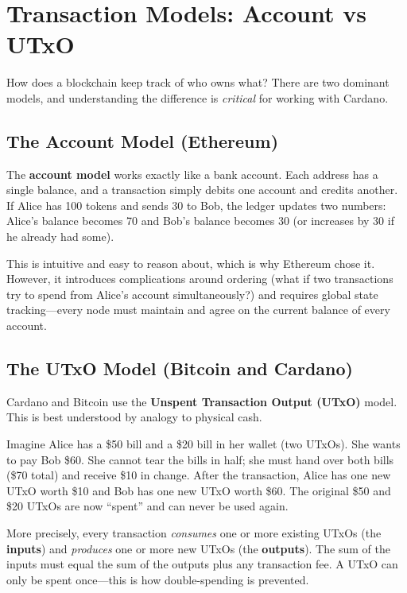 \section{Transaction Models: Account vs UTxO}
\label{sec:utxo-vs-account}

How does a blockchain keep track of who owns what?  There are two dominant
models, and understanding the difference is \emph{critical} for working with
Cardano.

\subsection{The Account Model (Ethereum)}

The \textbf{account model} works exactly like a bank account.  Each address
has a single balance, and a transaction simply debits one account and credits
another.  If Alice has 100 tokens and sends 30 to Bob, the ledger updates
two numbers: Alice's balance becomes 70 and Bob's balance becomes 30 (or
increases by 30 if he already had some).

This is intuitive and easy to reason about, which is why Ethereum chose it.
However, it introduces complications around ordering (what if two
transactions try to spend from Alice's account simultaneously?) and requires
global state tracking---every node must maintain and agree on the current
balance of every account.

\subsection{The UTxO Model (Bitcoin and Cardano)}

Cardano and Bitcoin use the \textbf{Unspent Transaction Output (UTxO)}
model.  This is best understood by analogy to physical cash.

Imagine Alice has a \$50 bill and a \$20 bill in her wallet (two UTxOs).  She
wants to pay Bob \$60.  She cannot tear the bills in half; she must hand over
both bills (\$70 total) and receive \$10 in change.  After the transaction,
Alice has one new UTxO worth \$10 and Bob has one new UTxO worth \$60.  The
original \$50 and \$20 UTxOs are now ``spent'' and can never be used again.

More precisely, every transaction \emph{consumes} one or more existing UTxOs
(the \textbf{inputs}) and \emph{produces} one or more new UTxOs (the
\textbf{outputs}).  The sum of the inputs must equal the sum of the outputs
plus any transaction fee.  A UTxO can only be spent once---this is how
double-spending is prevented.

